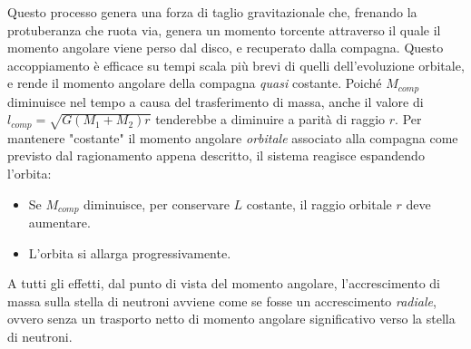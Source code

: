 Questo processo genera una forza di taglio gravitazionale che, frenando la protuberanza che ruota via, genera un momento torcente attraverso il quale il momento angolare viene perso dal disco, e recuperato dalla compagna. 
Questo accoppiamento è efficace su tempi scala più brevi di quelli dell'evoluzione orbitale, e rende il momento angolare della compagna \emph{quasi} costante.
Poiché $M_{comp}$ diminuisce nel tempo a causa del trasferimento di massa, anche il valore di $l_{comp} = \sqrt{G(M_1+M_2)r}$ tenderebbe a diminuire a parità di raggio $r$. 
Per mantenere "costante" il momento angolare \textit{orbitale} associato alla compagna come previsto dal ragionamento appena descritto, il sistema reagisce espandendo l'orbita:
\begin{itemize}
    \item Se $M_{comp}$ diminuisce, per conservare $L$ costante, il raggio orbitale $r$ deve aumentare.
    \item L'orbita si allarga progressivamente.
\end{itemize}
A tutti gli effetti, dal punto di vista del momento angolare, l'accrescimento di massa sulla stella di neutroni avviene come se fosse un accrescimento \emph{radiale}, ovvero senza un trasporto netto di momento angolare significativo verso la stella di neutroni.

